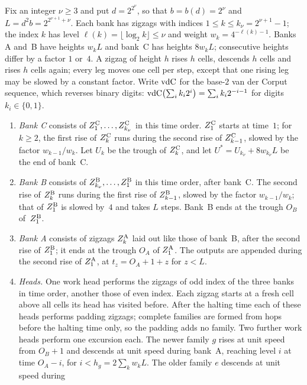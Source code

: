 \begin{definition}\label{def:sharp-geometry}
Fix an integer $\nu\ge3$ and put $d=2^{2^\nu}$, so that $b=b(d)=2^\nu$ and
$L=d^2b=2^{2^{\nu+1}+\nu}$. Each bank has zigzags with indices
$1\le k\le k_\nu=2^{\nu+1}-1$; the index $k$ has level $\ell(k)=\lfloor\log_2k\rfloor\le\nu$
and weight $w_k=4^{-\ell(k)-1}$. Banks A and~B have heights $w_kL$ and bank~C has
heights $8w_kL$; consecutive heights differ by a factor $1$ or~$4$. A zigzag of height
$h$ rises $h$ cells, descends $h$ cells and rises $h$ cells again; every leg moves one
cell per step, except that one rising leg may be slowed by a constant factor. Write
$\mathrm{vdC}$ for the base-$2$ van der Corput sequence, which reverses binary digits:
$\mathrm{vdC}\bigl(\sum_ik_i2^i\bigr)=\sum_ik_i2^{-i-1}$ for digits $k_i\in\{0,1\}$.
\begin{enumerate}[label=(\roman*)]
\item \emph{Bank C} consists of $Z^{\mathrm C}_1,\dots,Z^{\mathrm C}_{k_\nu}$ in this time order. $Z^{\mathrm C}_1$
starts at time~$1$; for $k\ge2$, the first rise of $Z^{\mathrm C}_k$ runs during the second rise
of $Z^{\mathrm C}_{k-1}$, slowed by the factor $w_{k-1}/w_k$. Let $U_k$ be the trough of $Z^{\mathrm C}_k$,
and let $U^*=U_{k_\nu}+8w_{k_\nu}L$ be the end of bank~C.
\item \emph{Bank B} consists of $Z^{\mathrm B}_{k_\nu},\dots,Z^{\mathrm B}_1$ in this time order, after
bank~C. The second rise of $Z^{\mathrm B}_k$ runs during the first rise of $Z^{\mathrm B}_{k-1}$, slowed by
the factor $w_{k-1}/w_k$; that of $Z^{\mathrm B}_1$ is slowed by~$4$ and takes $L$ steps. Bank~B
ends at the trough $O_B$ of~$Z^{\mathrm B}_1$.
\item \emph{Bank A} consists of zigzags $Z^{\mathrm A}_k$ laid out like those of bank~B, after the
second rise of $Z^{\mathrm B}_1$; it ends at the trough $O_A$ of $Z^{\mathrm A}_1$. The outputs are appended
during the second rise of $Z^{\mathrm A}_1$, at $t_z=O_A+1+z$ for $z<L$.
\item \emph{Heads.} One work head performs the zigzags of odd index of the three banks in
time order, another those of even index. Each zigzag starts at a fresh cell above all
cells its head has visited before. After
the halting time each of these heads performs padding zigzags; complete families are
formed from hops before the halting time only, so the padding adds no family. Two
further work heads perform one excursion each. The newer family $g$ rises at unit speed
from $O_B+1$ and descends at unit speed during bank~A, reaching level $i$ at time
$O_A-i$, for $i<h_g=2\sum_kw_kL$. The older family $e$ descends at unit speed during

\end{enumerate}
\end{definition}
